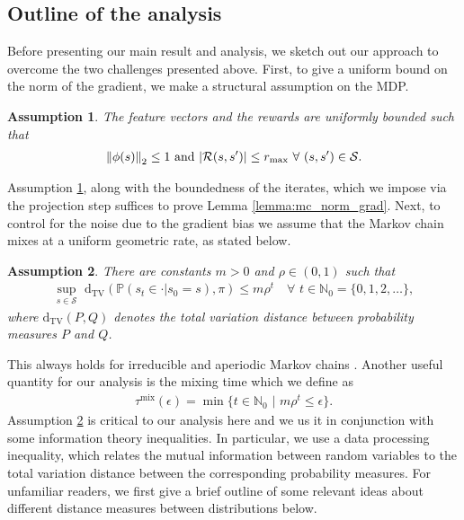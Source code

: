 \documentclass{colt2018} %
\DeclareMathOperator*{\mix}{mix}
\newtheorem{assumption}{Assumption}
\newcommand{\Rc}{\mathcal{R}}
\begin{document}
\subsection{Outline of the analysis}
\label{subsec:MC_intuition}
Before presenting our main result and analysis, we sketch out our approach to overcome the two challenges presented above. First, to give a uniform bound on the norm of the gradient, we make a structural assumption on the MDP. 
\begin{assumption}\label{as:0}
The feature vectors and the rewards are uniformly bounded such that
\begin{eqnarray*}
\norm{\phi(s)}_2 \leq 1 \,\, \text{and} \,\, \abs{\Rc(s,s')} \leq r_{\max} \,\, \forall \,\, (s,s') \in \mathcal{S}.
\end{eqnarray*}
\end{assumption}
Assumption \ref{as:0}, along with the boundedness of the iterates, which we impose via the projection step suffices to prove Lemma \ref{lemma:mc_norm_grad}. Next, to control for the noise due to the gradient bias we assume that the Markov chain mixes at a uniform geometric rate, as stated below.
\begin{assumption}\label{as:6}
There are constants $m > 0$ and $\rho \in (0,1)$ such that
\begin{eqnarray*}
\sup_{s \in \mathcal{S}} \,\, \text{d}_{\text{TV}} \left(\mathbb{P}(s_t \in \cdot | s_0 = s), \pi\right) \leq m \rho^t \quad \forall \,\, t \in \mathbb{N}_0 = \{0,1,2,\ldots\},
\end{eqnarray*}
where $\text{d}_{\text{TV}}(P,Q)$ denotes the total variation distance between probability measures $P$ and $Q$.
\end{assumption}
This always holds for irreducible and aperiodic Markov chains \citep{levin2017markov}. Another useful quantity for our analysis is the mixing time which we define as
\begin{eqnarray}
\label{eq:tau_mix}
\tau^{\mix}(\epsilon) = \min \{ t \in \mathbb{N}_0 \,\, | \,\, m \rho^t \leq \epsilon \}.
\end{eqnarray}
Assumption \ref{as:6} is critical to our analysis here and we us it in conjunction with some information theory inequalities. In particular, we use a data processing inequality, which relates the mutual information between random variables to the total variation distance between the corresponding probability measures. For unfamiliar readers, we first give a brief outline of some relevant ideas about different distance measures between distributions below.
\end{document}
